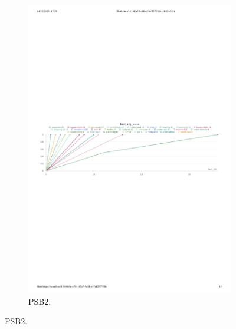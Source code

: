 \begin{figure}[H]
\begin{subfigure}{\textwidth}
\centering
\includegraphics[width=.94\linewidth, trim={0mm 120mm 0mm 133mm}, clip]{images/lexicase-psb2-2.pdf}
  \caption{PSB2.}
  \label{fig:psb2-score-lexicase}
\end{subfigure}



\end{figure}
